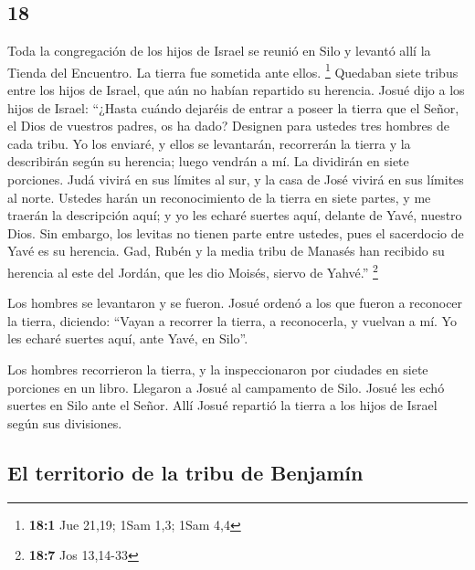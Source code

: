 \begin{paracol}{2}
\hypertarget{section-34}{%
\section{18}\label{section-34}}

 Toda la congregación de los hijos de Israel se reunió en
Silo y levantó allí la Tienda del Encuentro. La tierra fue sometida ante
ellos. \footnote{\textbf{18:1} Jue 21,19; 1Sam 1,3; 1Sam 4,4}
 Quedaban siete tribus entre los hijos de Israel, que aún
no habían repartido su herencia.  Josué dijo a los hijos
de Israel: ``¿Hasta cuándo dejaréis de entrar a poseer la tierra que el
Señor, el Dios de vuestros padres, os ha dado?  Designen
para ustedes tres hombres de cada tribu. Yo los enviaré, y ellos se
levantarán, recorrerán la tierra y la describirán según su herencia;
luego vendrán a mí.  La dividirán en siete porciones. Judá
vivirá en sus límites al sur, y la casa de José vivirá en sus límites al
norte.  Ustedes harán un reconocimiento de la tierra en
siete partes, y me traerán la descripción aquí; y yo les echaré suertes
aquí, delante de Yavé, nuestro Dios.  Sin embargo, los
levitas no tienen parte entre ustedes, pues el sacerdocio de Yavé es su
herencia. Gad, Rubén y la media tribu de Manasés han recibido su
herencia al este del Jordán, que les dio Moisés, siervo de Yahvé.''
\footnote{\textbf{18:7} Jos 13,14-33}

 Los hombres se levantaron y se fueron. Josué ordenó a los
que fueron a reconocer la tierra, diciendo: ``Vayan a recorrer la
tierra, a reconocerla, y vuelvan a mí. Yo les echaré suertes aquí, ante
Yavé, en Silo''.

 Los hombres recorrieron la tierra, y la inspeccionaron
por ciudades en siete porciones en un libro. Llegaron a Josué al
campamento de Silo.  Josué les echó suertes en Silo ante
el Señor. Allí Josué repartió la tierra a los hijos de Israel según sus
divisiones.

\hypertarget{el-territorio-de-la-tribu-de-benjamuxedn}{%
\subsection{El territorio de la tribu de
Benjamín}\label{el-territorio-de-la-tribu-de-benjamuxedn}}


\end{paracol}
